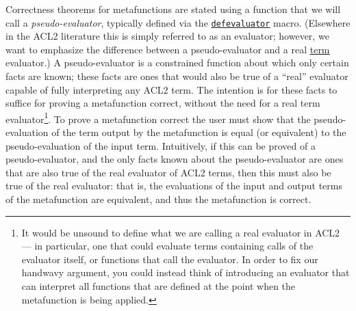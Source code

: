 Correctness theorems for metafunctions are stated using a
function that we will call a \textit{pseudo-evaluator}, typically
defined via the
\href{http://www.cs.utexas.edu/users/moore/acl2/manuals/current/manual/index.html?topic=ACL2\_\_\_\_DEFEVALUATOR}{\underline{\tt defevaluator}}
macro.  (Elsewhere in the ACL2
literature this is simply referred to as an evaluator; however, we
want to emphasize the difference between a pseudo-evaluator and a real
\href{http://www.cs.utexas.edu/users/moore/acl2/manuals/current/manual/index.html?topic=ACL2\_\_\_\_TERM}{\underline{term}}
evaluator.)  A pseudo-evaluator is a constrained function about
which only certain facts are known; these facts are ones that would
also be true of a ``real'' evaluator capable of fully interpreting any
ACL2 term.  The intention is for these facts to suffice for
proving a metafunction correct, without the need for
a real term evaluator\footnote{
  It would be unsound to define what we are calling a real evaluator
  in ACL2 --- in particular, one that could evaluate terms containing
  calls of the evaluator itself, or functions that call the evaluator.
  In order to fix our handwavy argument, you could instead think of
  introducing an evaluator that can interpret all functions that are
  defined at the point when the metafunction is being applied.
}.
To prove a metafunction correct
the user must show that the pseudo-evaluation of the term output by
the metafunction is equal (or equivalent) to the pseudo-evaluation of
the input term.  Intuitively, if this can be proved of a
pseudo-evaluator, and the only facts known about the pseudo-evaluator
are ones that are also true of the real evaluator of ACL2 terms, then
this must also be true of the real evaluator: that is, the evaluations
of the input and output terms of the metafunction are equivalent, and
thus the metafunction is correct.

